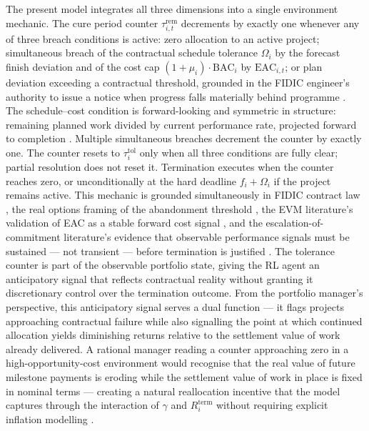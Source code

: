 The present model integrates all three dimensions into a single environment
mechanic. The cure period counter $\tau_{i,t}^{\mathrm{rem}}$ decrements by
exactly one whenever any of three breach conditions is active: zero allocation
to an active project; simultaneous breach of the contractual schedule tolerance
$\Omega_i$ by the forecast finish deviation and of the cost cap
$(1+\mu_i)\cdot\mathrm{BAC}_i$ by $\mathrm{EAC}_{i,t}$; or plan deviation
exceeding a contractual threshold, grounded in the FIDIC engineer's authority
to issue a notice when progress falls materially behind programme
\citep{FIDIC2017}. The schedule--cost condition is forward-looking and
symmetric in structure: remaining planned work divided by current performance
rate, projected forward to completion \citep{Fleming2010, christensen1993est}.
Multiple simultaneous breaches decrement the counter by exactly one. The
counter resets to $\tau_i^{\mathrm{tol}}$ only when all three conditions are
fully clear; partial resolution does not reset it. Termination executes when
the counter reaches zero, or unconditionally at the hard deadline
$f_i + \Omega_i$ if the project remains active. This mechanic is grounded
simultaneously in FIDIC contract law \citep{FIDIC2017, Ndekugri2008}, the real
options framing of the abandonment threshold \citep{Dixit1994,
Huchzermeier2001}, the EVM literature's validation of EAC as a stable
forward cost signal \citep{christensen1993est, Lipke2003}, and the
escalation-of-commitment literature's evidence that observable performance
signals must be sustained --- not transient --- before termination is
justified \citep{Staw1987}. The tolerance counter is part of the observable portfolio state, giving the
RL agent an anticipatory signal that reflects contractual reality without
granting it discretionary control over the termination outcome. From the
portfolio manager's perspective, this anticipatory signal serves a dual
function --- it flags projects approaching contractual failure while also
signalling the point at which continued allocation yields diminishing returns
relative to the settlement value of work already delivered. A rational manager
reading a counter approaching zero in a high-opportunity-cost environment
would recognise that the real value of future milestone payments is eroding
while the settlement value of work in place is fixed in nominal terms ---
creating a natural reallocation incentive that the model captures through the
interaction of $\gamma$ and $R_i^{\mathrm{term}}$ without requiring explicit
inflation modelling \citep{Dixit1994, FIDIC2017}.


